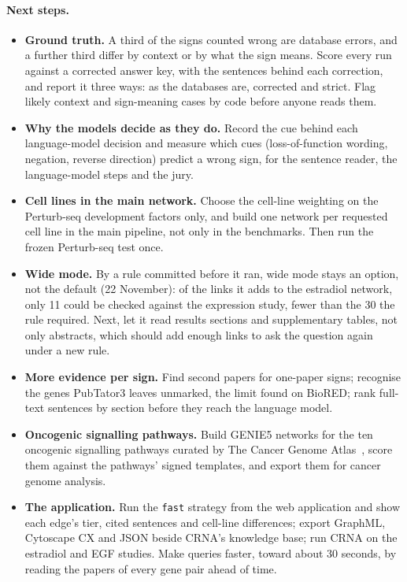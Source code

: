 \documentclass[11pt,a4paper]{article}
\newcommand{\gen}{GENIE5}
\newcommand{\code}[1]{\texttt{#1}}
\begin{document}
\paragraph{Next steps.}
\begin{itemize}
  \item \textbf{Ground truth.} A third of the signs counted wrong are database errors, and a
    further third differ by context or by what the sign means. Score every run against a
    corrected answer key, with the sentences behind each correction, and report it three ways:
    as the databases are, corrected and strict. Flag likely context and sign-meaning cases by
    code before anyone reads them.
  \item \textbf{Why the models decide as they do.} Record the cue behind each language-model
    decision and measure which cues (loss-of-function wording, negation, reverse direction)
    predict a wrong sign, for the sentence reader, the language-model steps and the jury.
  \item \textbf{Cell lines in the main network.} Choose the cell-line weighting on the
    Perturb-seq development factors only, and build one network per requested cell line in the
    main pipeline, not only in the benchmarks. Then run the frozen Perturb-seq test once.
  \item \textbf{Wide mode.} By a rule committed before it ran, wide mode stays an option, not the
    default (22 November): of the links it adds to the estradiol network, only 11 could be checked
    against the expression study, fewer than the 30 the rule required. Next, let it read results
    sections and supplementary tables, not only abstracts, which should add enough links to ask
    the question again under a new rule.
  \item \textbf{More evidence per sign.} Find second papers for one-paper signs; recognise the
    genes PubTator3 leaves unmarked, the limit found on BioRED; rank full-text sentences by
    section before they reach the language model.
  \item \textbf{Oncogenic signalling pathways.} Build \gen{} networks for the ten oncogenic
    signalling pathways curated by The Cancer Genome Atlas~\cite{tcgapathways}, score them against
    the pathways' signed templates, and export them for cancer genome analysis.
  \item \textbf{The application.} Run the \code{fast} strategy from the web application and show
    each edge's tier, cited sentences and cell-line differences; export GraphML, Cytoscape CX and
    JSON beside CRNA's knowledge base; run CRNA on the estradiol and EGF studies. Make queries
    faster, toward about 30 seconds, by reading the papers of every gene pair ahead of time.
\end{itemize}
\clearpage
\end{document}
